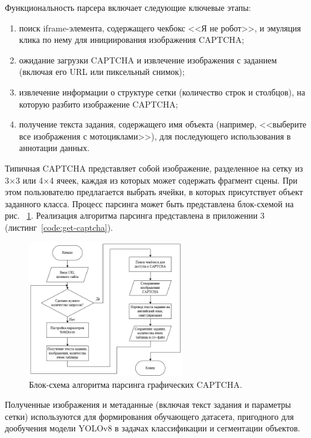 Функциональность парсера включает следующие ключевые этапы:

\begin{enumerate}
    \item поиск iframe-элемента, содержащего чекбокс <<Я не робот>>, и эмуляция 
    клика по нему для инициирования изображения CAPTCHA;
    \item ожидание загрузки CAPTCHA и извлечение изображения с заданием (включая 
    его URL или пиксельный снимок);
    \item извлечение информации о структуре сетки (количество строк и столбцов), 
    на которую разбито изображение CAPTCHA;
    \item получение текста задания, содержащего имя объекта (например, <<выберите 
    все изображения с мотоциклами>>), для последующего использования в аннотации 
    данных.
\end{enumerate}

Типичная CAPTCHA представляет собой изображение, разделенное на сетку из 3×3 или 
4×4 ячеек, каждая из которых может содержать фрагмент сцены. При этом 
пользователю предлагается выбрать ячейки, в которых присутствует объект заданного 
класса. Процесс парсинга может быть представлена блок-схемой на рис.~
\ref{fig:captcha-flow}. Реализация алгоритма парсинга представлена в приложении 3 
(листинг~\ref{code:get-captcha}).

\begin{figure}[H]
    \centering
    \includegraphics[width=0.6\textwidth]{imgs/imagecaptcha/image_captcha_flow.png}
    \caption{Блок-схема алгоритма парсинга графических CAPTCHA.}
    \label{fig:captcha-flow}
\end{figure}
\vspace{-0.85cm}

Полученные изображения и метаданные (включая текст задания и параметры сетки) 
используются для формирования обучающего датасета, пригодного для дообучения 
модели YOLOv8 в задачах классификации и сегментации объектов.


